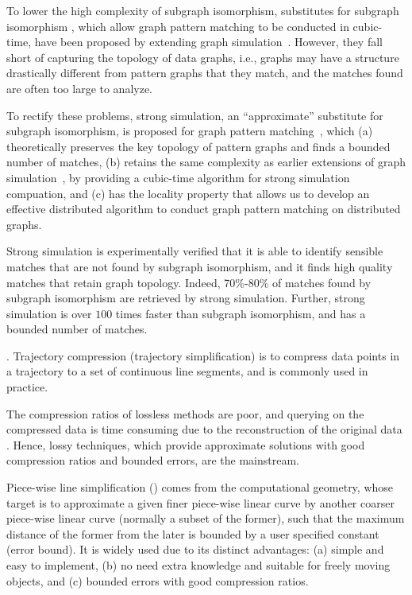 To lower the high complexity of subgraph isomorphism, substitutes for subgraph isomorphism \cite{FanLMTWW10,FanLMTW11}, which allow graph pattern matching to be conducted in cubic-time, have been proposed by extending graph simulation~\cite{infsimu95}. However, they fall short of capturing the topology of data graphs, i.e., graphs may have a structure drastically different from pattern graphs that they match, and the matches found are often too large to analyze.

To rectify these problems, strong simulation, an ``approximate'' substitute for subgraph isomorphism, is proposed for graph pattern matching~\cite{tods-MaCFHW14}, which (a) theoretically preserves the key topology of pattern graphs and finds a bounded number of matches, (b) retains the same complexity as earlier extensions of graph simulation~\cite{FanLMTWW10,FanLMTW11}, by providing a cubic-time algorithm for strong simulation compuation, and (c) has the locality property that allows us to develop an effective distributed algorithm to conduct graph pattern matching on distributed graphs.

Strong simulation is experimentally verified that it is able to identify sensible matches that are not found by subgraph isomorphism, and it finds high
quality matches that retain graph topology. Indeed, 70\%-80\% of matches found by subgraph
isomorphism are retrieved by strong simulation. Further, strong simulation is over $100$ times faster than subgraph isomorphism, and has a bounded number of matches.



.  Trajectory compression (\aka trajectory simplification) is to compress data points in a trajectory to a set of continuous line segments, and is commonly used  in practice.

The compression ratios of lossless methods are poor, and querying on the compressed data is time consuming due to the reconstruction of the original data \cite{Nibali:Trajic}. Hence, lossy techniques, which  provide approximate solutions with good compression ratios and bounded errors, are the mainstream.

Piece-wise line simplification (\lsa) comes from the computational geometry, whose target is to approximate a given finer piece-wise linear curve by another coarser piece-wise linear curve ({normally} a subset of the former), such that the maximum distance of the former from the later is bounded by a user specified constant (\ie error bound). It is widely used due to its distinct advantages: (a) simple and easy to implement, (b) no need extra knowledge and suitable for freely  moving  objects, and (c) bounded errors with good compression ratios.

